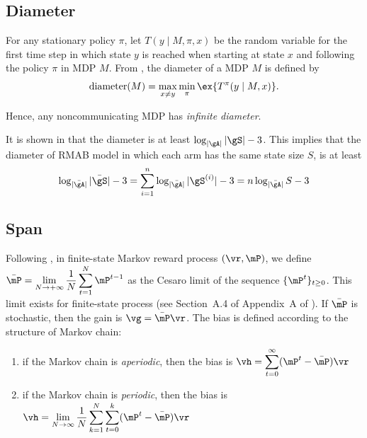 \subsection{Diameter}

For any stationary policy $\pi$, let $T(y\mid M,\pi,x)$ be the random variable for the first time step in which state $y$ is reached when starting at state $x$ and following the policy $\pi$ in MDP $M$.
From \cite[Definition 1]{jaksch2010near}, the diameter of a MDP $M$ is defined by
\begin{align*}
    \mathrm{diameter}(M) = \max_{x\neq y}\min_{\pi} \ex{T^\pi(y\mid M, x)}.
\end{align*}

Hence, any noncommunicating MDP has \emph{infinite diameter}.

It is shown in \cite[Appendix A]{jaksch2010near} that the diameter is at least $\log_{|\gA|}|\gS|-3$.
This implies that the diameter of RMAB model in which each arm has the same state size $S$, is at least
\begin{equation*}
    \log_{|\bar{\gA}|}|\bar{\gS}| -3 = \sum_{i=1}^{n}\log_{|\bar{\gA}|}|\gS^{(i)}| -3 =n\log_{|\bar{\gA}|}S -3
\end{equation*}

\subsection{Span}


Following \cite[Chapter~8]{puterman2014markov}, in finite-state Markov reward process $(\vr, \mP)$, we define $\bar{\mP}=\displaystyle\lim_{N\to+\infty}\frac1N\sum_{t=1}^N\mP^{t-1}$ as the Cesaro limit of the sequence $\{\mP^t\}_{t\ge0}$.
This limit exists for finite-state process (see Section~A.4 of Appendix~A of \cite{puterman2014markov}).
If $\bar{\mP}$ is stochastic, then the gain is $\vg=\bar{\mP}\vr$.
The bias is defined according to the structure of Markov chain:
\begin{enumerate}
    \item if the Markov chain is \emph{aperiodic}, then the bias is $\vh=\displaystyle\sum_{t=0}^\infty(\mP^t-\bar{\mP})\vr$
    \item if the Markov chain is \emph{periodic}, then the bias is $\vh=\displaystyle\lim_{N\to\infty}\frac1N\sum_{k=1}^N\sum_{t=0}^k(\mP^t-\bar{\mP})\vr$
\end{enumerate}


